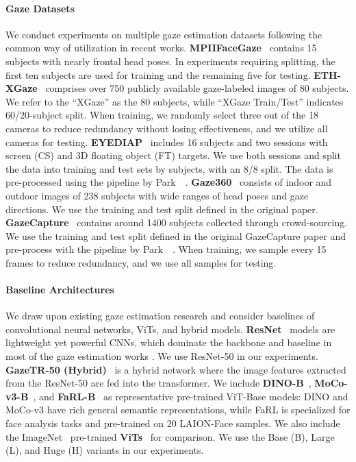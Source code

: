 \paragraph{Gaze Datasets}
We conduct experiments on multiple gaze estimation datasets following the common way of utilization in recent works.
\textbf{MPIIFaceGaze}~\cite{zhang2017s} contains 15 subjects with nearly frontal head poses. 
In experiments requiring splitting, the first ten subjects are used for training and the remaining five for testing.
\textbf{ETH-XGaze}~\cite{zhang2020eth} comprises over \SI{750}{\kilo{}} publicly available gaze-labeled images of 80 subjects. We refer to the ``XGaze'' as the 80 subjects, while ``XGaze Train/Test'' indicates 60/20-subject split.
When training, we randomly select three out of the 18 cameras to reduce redundancy without losing effectiveness, and we utilize all cameras for testing. 
\textbf{EYEDIAP}~\cite{funes2014eyediap} includes 16 subjects and two sessions with screen (CS) and 3D floating object (FT) targets. 
We use both sessions and split the data into training and test sets by subjects, with an 8/8 split.
The data is pre-processed using the pipeline by Park~\etal~\cite{park2019few}. 
\textbf{Gaze360}~\cite{kellnhofer2019gaze360} consists of indoor and outdoor images of 238 subjects with wide ranges of head poses and gaze directions. We use the training and test split defined in the original paper.
\textbf{GazeCapture}~\cite{krafka2016eye} contains around 1400 subjects collected through crowd-sourcing. We use the training and test split defined in the original GazeCapture paper and pre-process with the pipeline by Park~\etal~\cite{park2019few}.
When training, we sample every 15 frames to reduce redundancy, and we use all samples for testing.


\paragraph{Baseline Architectures}
We draw upon existing gaze estimation research and consider baselines of convolutional neural networks, ViTs, and hybrid models.
\textbf{ResNet}~\cite{he2016deep} models are lightweight yet powerful CNNs, which dominate the backbone and baseline in most of the gaze estimation works \cite{zhang2020eth,cheng2022puregaze,xu2023learning,zhao2024improving}. 
We use ResNet-50 in our experiments.
\textbf{GazeTR-50 (Hybrid)}~\cite{cheng2022gaze} is a hybrid network where the image features extracted from the ResNet-50 are fed into the transformer.
We include \textbf{DINO-B}~\cite{caron2021emerging}, \textbf{MoCo-v3-B}~\cite{chen2021empirical}, and \textbf{FaRL-B}~\cite{zheng2022general} as representative pre-trained ViT-Base models: DINO and MoCo-v3 have rich general semantic representations, while FaRL is specialized for face analysis tasks and pre-trained on \SI{20}{\mega{}} LAION-Face samples.
We also include the ImageNet~\cite{deng2009imagenet} pre-trained \textbf{ViTs}~\cite{dosovitskiy2020vit} for comparison.
We use the Base (B), Large (L), and Huge (H) variants in our experiments.

